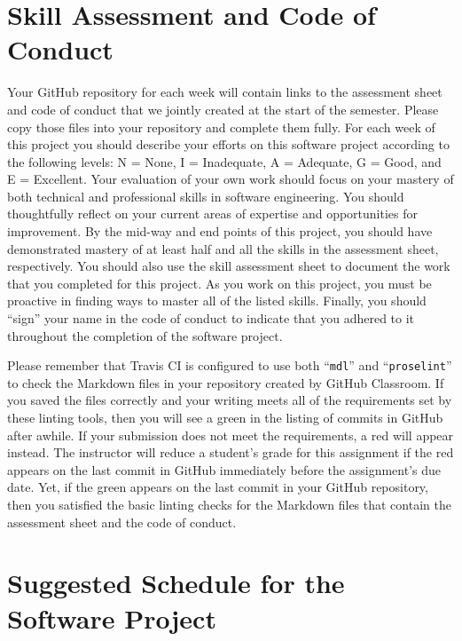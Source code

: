 \documentclass[11pt]{article}
\newcommand{\command}[1]{``\lstinline{#1}''}
\newcommand{\checkmark}{\ding{51}}
\newcommand{\naughtmark}{\ding{55}}
\begin{document}
\section*{Skill Assessment and Code of Conduct}


Your GitHub repository for each week will contain links to the assessment sheet
and code of conduct that we jointly created at the start of the semester. Please
copy those files into your repository and complete them fully. For each week of
this project you should describe your efforts on this software project according
to the following levels: N = None, I = Inadequate, A = Adequate, G = Good, and E
= Excellent. Your evaluation of your own work should focus on your mastery of
both technical and professional skills in software engineering. You should
thoughtfully reflect on your current areas of expertise and opportunities for
improvement. By the mid-way and end points of this project, you should have
demonstrated mastery of at least half and all the skills in the assessment
sheet, respectively. You should also use the skill assessment sheet to document
the work that you completed for this project. As you work on this project, you
must be proactive in finding ways to master all of the listed skills. Finally,
you should ``sign'' your name in the code of conduct to indicate that you
adhered to it throughout the completion of the software project.


Please remember that Travis CI is configured to use both \command{mdl} and
\command{proselint} to check the Markdown files in your repository created by
GitHub Classroom.
%
If you saved the files correctly and your writing meets all of the requirements
set by these linting tools, then you will see a green \checkmark{} in the
listing of commits in GitHub after awhile. If your submission does not meet the
requirements, a red \naughtmark{} will appear instead. The instructor will
reduce a student's grade for this assignment if the red \naughtmark{} appears on
the last commit in GitHub immediately before the assignment's due date. Yet, if
the green \checkmark{} appears on the last commit in your GitHub repository,
then you satisfied the basic linting checks for the Markdown files that contain
the assessment sheet and the code of conduct.

\section*{Suggested Schedule for the Software Project}
\end{document}
